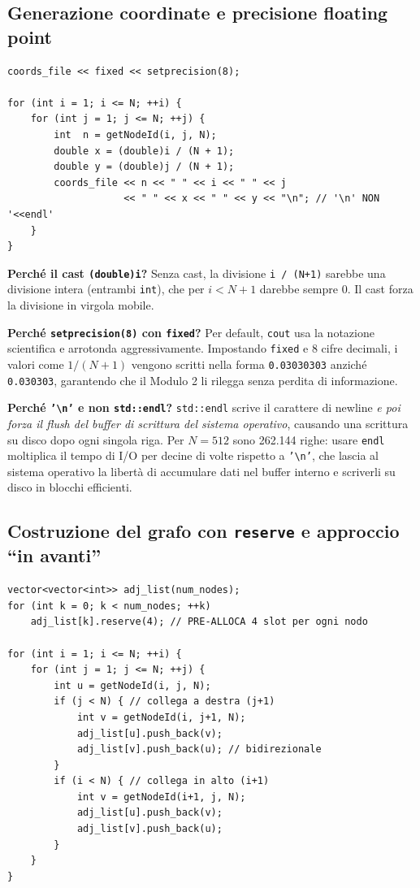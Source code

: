 \documentclass[a4paper,11pt]{article}
\theoremstyle{definition}
\begin{document}
\subsection{Generazione coordinate e precisione floating point}

\begin{lstlisting}[style=cpp, caption={Scrittura delle coordinate con precisione controllata}]
coords_file << fixed << setprecision(8);

for (int i = 1; i <= N; ++i) {
    for (int j = 1; j <= N; ++j) {
        int  n = getNodeId(i, j, N);
        double x = (double)i / (N + 1);
        double y = (double)j / (N + 1);
        coords_file << n << " " << i << " " << j
                    << " " << x << " " << y << "\n"; // '\n' NON '<<endl'
    }
}
\end{lstlisting}

\textbf{Perché il cast \texttt{(double)i}?} Senza cast, la divisione \texttt{i / (N+1)} sarebbe una divisione intera (entrambi \texttt{int}), che per $i < N+1$ darebbe sempre 0. Il cast forza la divisione in virgola mobile.

\textbf{Perché \texttt{setprecision(8)} con \texttt{fixed}?} Per default, \texttt{cout} usa la notazione scientifica e arrotonda aggressivamente. Impostando \texttt{fixed} e 8 cifre decimali, i valori come $1/(N+1)$ vengono scritti nella forma \texttt{0.03030303} anziché \texttt{0.030303}, garantendo che il Modulo 2 li rilegga senza perdita di informazione.

\textbf{Perché \texttt{'\textbackslash n'} e non \texttt{std::endl}?} \texttt{std::endl} scrive il carattere di newline \emph{e poi forza il flush del buffer di scrittura del sistema operativo}, causando una scrittura su disco dopo ogni singola riga. Per $N=512$ sono 262.144 righe: usare \texttt{endl} moltiplica il tempo di I/O per decine di volte rispetto a \texttt{'\textbackslash n'}, che lascia al sistema operativo la libertà di accumulare dati nel buffer interno e scriverli su disco in blocchi efficienti.

\subsection{Costruzione del grafo con \texttt{reserve} e approccio ``in avanti''}

\begin{lstlisting}[style=cpp, caption={Lista di adiacenza con pre-allocazione}]
vector<vector<int>> adj_list(num_nodes);
for (int k = 0; k < num_nodes; ++k)
    adj_list[k].reserve(4); // PRE-ALLOCA 4 slot per ogni nodo

for (int i = 1; i <= N; ++i) {
    for (int j = 1; j <= N; ++j) {
        int u = getNodeId(i, j, N);
        if (j < N) { // collega a destra (j+1)
            int v = getNodeId(i, j+1, N);
            adj_list[u].push_back(v);
            adj_list[v].push_back(u); // bidirezionale
        }
        if (i < N) { // collega in alto (i+1)
            int v = getNodeId(i+1, j, N);
            adj_list[u].push_back(v);
            adj_list[v].push_back(u);
        }
    }
}
\end{lstlisting}
\end{document}
